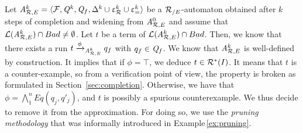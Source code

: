 


Let ${\it A}_{\mathcal R,E}^k = \langle \mathcal{F}, \mathit Q^k, \mathit Q_f, \Delta^k \cup \upvarepsilon_{\mathcal R}^k \cup \upvarepsilon_{=}^k
\rangle$ be a ${\mathcal R_{/E}}$-automaton obtained after $k$ steps of completion and
widening from ${\it A}_{\mathcal R,E}^0$ and assume
that %
$\mathcal{L}({\it A}_{\mathcal R,E}^k) \cap Bad \not=\emptyset$.  Let $t$ be a term of
$\mathcal{L}({\it A}_{\mathcal R,E}^k) \cap Bad$.  Then, we know that there exists a run $t
\xrightarrow{\phi}_{{\it A}_{\mathcal R,E}^k} q_f$ with $q_f \in \mathit Q_f$.  We know that
${\it A}_{\mathcal R,E}^k$ is well-defined by construction.  It implies that if $\phi
= \top$, we deduce $t \in \mathcal R^*(I)$.  It means that $t$ is a
counter-example, so from a verification point of view, the property is
broken as formulated in Section~\ref{sec:completion}.  Otherwise, we
have that $\phi = \bigwedge_1^n Eq(q_j, q'_j)$, and $t$ is possibly a
spurious counterexample. We thus decide to remove it from the
approximation. For doing so, we use the {\em pruning
  methodology} that was informally introduced in
Example\,\ref{ex:pruning}.
\vspace{-.6cm}
